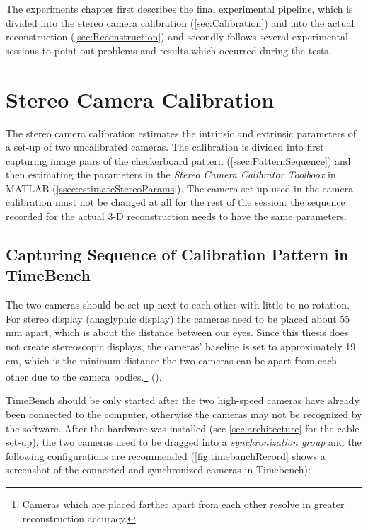 \label{c:Experiments}
The experiments chapter first describes the final experimental pipeline, which is divided into the stereo camera calibration (\autoref{sec:Calibration}) and into the actual reconstruction (\autoref{sec:Reconstruction}) and secondly follows several experimental sessions to point out problems and results which occurred during the tests.

\section{Stereo Camera Calibration}\label{sec:Calibration}
The stereo camera calibration estimates the intrinsic and extrinsic parameters of a set-up of two uncalibrated cameras. The calibration is divided into first capturing image pairs of the checkerboard pattern (\autoref{ssec:PatternSequence}) and then estimating the parameters in the \textit{Stereo Camera Calibrator Toolboox} in MATLAB (\autoref{ssec:estimateStereoParams}). The camera set-up used in the camera calibration must not be changed at all for the rest of the session: the sequence recorded for the actual 3-D reconstruction needs to have the same parameters.    

\subsection{Capturing Sequence of Calibration Pattern in TimeBench}\label{ssec:PatternSequence}
The two cameras should be set-up next to each other with little to no rotation. For stereo display (anaglyphic display) the cameras need to be placed about 55 mm apart, which is about the distance between our eyes. Since this thesis does not create stereoscopic displays, the cameras' baseline is set to approximately 19 cm, which is the minimum distance the two cameras can be apart from each other due to the camera bodies.\footnote{Cameras which are placed farther apart from each other resolve in greater reconstruction accuracy.} (\cite{StereoCalib.2016}).  

TimeBench should be only started after the two high-speed cameras have already been connected to the computer, otherwise the cameras may not be recognized by the software. After the hardware was installed (see \autoref{sec:architecture} for the cable set-up), the two cameras need to be dragged into a \textit{synchronization group} and the following configurations are recommended (\autoref{fig:timebanchRecord} shows a screenshot of the connected and synchronized cameras in Timebench): 

